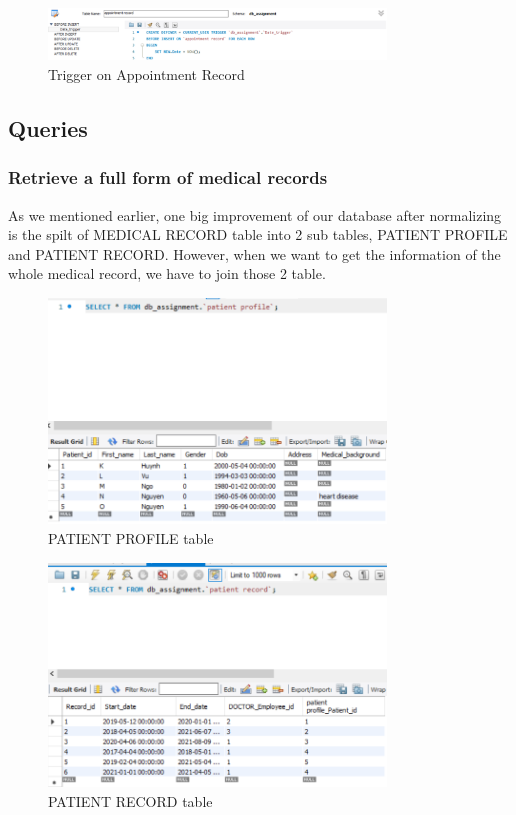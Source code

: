 \begin{figure}[H]
  \centering
  \includegraphics[width=0.8\textwidth]{assets/trigger_3.png}
  \captionsetup{justification=centering,margin=2cm}
  \caption{Trigger on Appointment Record}
\end{figure}

\subsection{Queries}

\subsubsection{Retrieve a full form of medical records}
As we mentioned earlier, one big improvement of our database after normalizing is the spilt of MEDICAL RECORD table into 2 sub tables, PATIENT PROFILE and PATIENT RECORD\@.
However, when we want to get the information of the whole medical record, we have to join those 2 table.

\begin{figure}[H]
  \centering
  \includegraphics[width=0.8\textwidth]{assets/query_1c.png}
  \captionsetup{justification=centering,margin=2cm}
  \caption{PATIENT PROFILE table}
\end{figure}

\begin{figure}[H]
  \centering
  \includegraphics[width=0.8\textwidth]{assets/query_1b.png}
  \captionsetup{justification=centering,margin=2cm}
  \caption{PATIENT RECORD table}
\end{figure}

